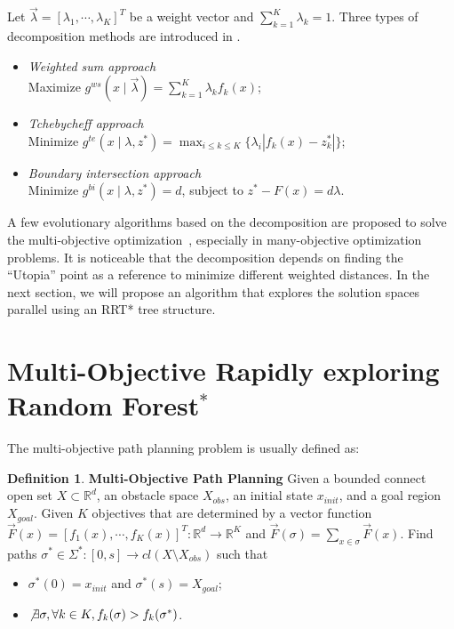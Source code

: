\documentclass[conference]{IEEEtran}
\theoremstyle{definition}
\newtheorem{defn}{Definition}[section]
\begin{document}
Let $ \vec{\lambda} = [ \lambda_{1} , \cdots , \lambda_{K}  ]^{T} $ be a weight vector and $ \sum_{k=1}^{K} \lambda_{k} = 1 $.
Three types of decomposition methods are introduced in \cite{4358754}.
\begin{itemize}
\item \emph{Weighted sum approach} \\
Maximize $ g^{ws} (x \mid \vec{\lambda}) = \sum_{k=1}^{K} \lambda_{k} f_{k} (x) $;
\item \emph{Tchebycheff approach} \\
Minimize $ g^{te} (x \mid \lambda , z^{*}) = \max_{i \leq k \leq K}  \{ \lambda_{i} | f_{k}(x) - z^{*}_{k}  | \} $;
\item \emph{Boundary intersection approach} \\
Minimize $ g^{bi} (x \mid \lambda , z^{*} ) = d $, subject to $ z^{*} - F(x) = d \lambda $.
\end{itemize}
A few evolutionary algorithms based on the decomposition are proposed to solve the multi-objective optimization~\cite{6600851}, 
especially in many-objective optimization problems.
It is noticeable that the decomposition depends on finding the ``Utopia'' point as a reference to minimize different weighted distances.
In the next section, we will propose an algorithm that explores the solution spaces parallel using an RRT* tree structure.



\section{Multi-Objective Rapidly exploring Random Forest$^{*}$}
\label{sec:morrt}

The multi-objective path planning problem is usually defined as:
\begin{defn}{ \textbf{Multi-Objective Path Planning} }
	Given a bounded connect open set $ X \subset \mathbb{R}^{d} $, an obstacle space $ X_{obs} $, an initial state $ x_{init} $, and a goal region $ X_{goal} $.
	Given $ K $ objectives that are determined by a vector function
	$ \vec{F}(x) = [ f_{1} (x), \cdots , f_{K}(x) ]^{T} : \mathbb{R}^{d} \rightarrow \mathbb{R}^{K} $ and 
	$ \vec{F}(\sigma) = \sum_{x \in \sigma} \vec{F}(x) $.
	Find paths $ \sigma^{*} \in \Sigma^{*}  : [0, s] \rightarrow cl(  X \setminus X_{obs} ) $ such that
	\begin{itemize}
		\item $ \sigma^{*} (0) = x_{init} $ and $ \sigma^{*} (s) = X_{goal}  $;
		\item $ \not \exists \sigma , \forall k \in K, f_{k} (\sigma) > f_{k} (\sigma^{*}) $.
	\end{itemize}
\end{defn}
\end{document}
